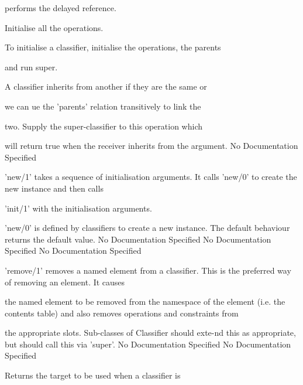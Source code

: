       performs the delayed reference.

     Initialise all the operations.

      To initialise a classifier, initialise the operations, the parents

      and run super.

      A classifier inherits from another if they are the same or

      we can ue the 'parents' relation transitively to link the

      two. Supply the super-classifier to this operation which

      will return true when the receiver inherits from the argument.
No Documentation Specified

      'new/1' takes a sequence of initialisation arguments.
      It calls 'new/0' to create the new instance and then calls

      'init/1' with the initialisation arguments.

      'new/0' is defined by classifiers to create  a new instance.
      The default behaviour returns the default value.
No Documentation Specified
No Documentation Specified
No Documentation Specified

      'remove/1' removes a named element from a classifier.
      This is the preferred way of removing an element. It causes

      the named element to be removed from the namespace of the element (i.e.
      the contents table) and also removes operations and constraints from

      the appropriate slots. Sub-classes of Classifier should exte-nd this as 
      appropriate, but should call this via 'super'.
No Documentation Specified
No Documentation Specified

      Returns the target to be used when a classifier is

